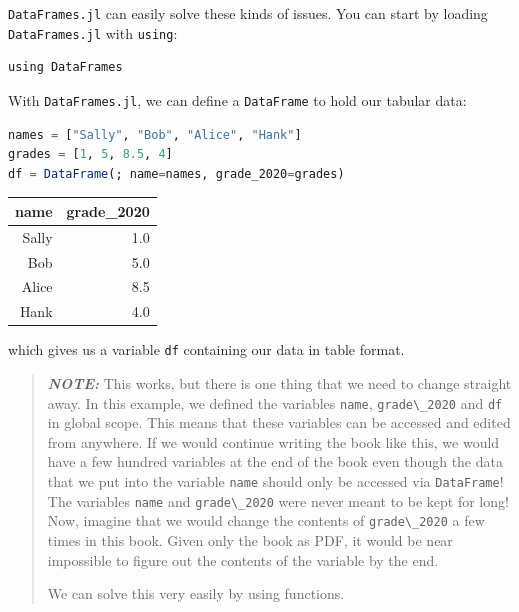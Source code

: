 \documentclass[
  notoc %
]{tufte-book}
\newcommand{\passthrough}[1]{#1}
\begin{document}
\passthrough{\lstinline!DataFrames.jl!} can easily solve these kinds of
issues. You can start by loading \passthrough{\lstinline!DataFrames.jl!}
with \passthrough{\lstinline!using!}:

\begin{lstlisting}
using DataFrames
\end{lstlisting}

With \passthrough{\lstinline!DataFrames.jl!}, we can define a
\passthrough{\lstinline!DataFrame!} to hold our tabular data:

\begin{lstlisting}[language=Julia]
names = ["Sally", "Bob", "Alice", "Hank"]
grades = [1, 5, 8.5, 4]
df = DataFrame(; name=names, grade_2020=grades)
\end{lstlisting}

\begin{longtable}[]{@{}rr@{}}
\toprule()
name & grade\_2020 \\
\midrule()
\endhead
Sally & 1.0 \\
Bob & 5.0 \\
Alice & 8.5 \\
Hank & 4.0 \\
\bottomrule()
\end{longtable}

which gives us a variable \passthrough{\lstinline!df!} containing our
data in table format.

\begin{quote}
\textbf{\emph{NOTE:}} This works, but there is one thing that we need to
change straight away. In this example, we defined the variables
\passthrough{\lstinline!name!}, \passthrough{\lstinline!grade\_2020!}
and \passthrough{\lstinline!df!} in global scope. This means that these
variables can be accessed and edited from anywhere. If we would continue
writing the book like this, we would have a few hundred variables at the
end of the book even though the data that we put into the variable
\passthrough{\lstinline!name!} should only be accessed via
\passthrough{\lstinline!DataFrame!}! The variables
\passthrough{\lstinline!name!} and \passthrough{\lstinline!grade\_2020!}
were never meant to be kept for long! Now, imagine that we would change
the contents of \passthrough{\lstinline!grade\_2020!} a few times in
this book. Given only the book as PDF, it would be near impossible to
figure out the contents of the variable by the end.

We can solve this very easily by using functions.
\end{quote}
\end{document}
